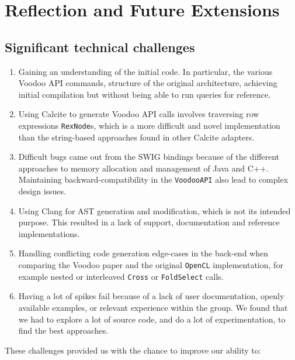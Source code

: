 \chapter{Reflection and Future Extensions}

\section{Significant technical challenges}

\begin{enumerate}
    \item Gaining an understanding of the initial code. In particular, the various Voodoo API commands, structure of the original architecture, achieving initial compilation but without being able to run queries for reference.
    \item Using Calcite to generate Voodoo API calls involves traversing row expressions \texttt{RexNode}s, which is a more difficult and novel implementation than the string-based approaches found in other Calcite adapters.
    \item Difficult bugs came out from the SWIG bindings because of the different approaches to memory allocation and management of Java and C++. Maintaining backward-compatibility in the \texttt{VoodooAPI} also lead to complex design issues.
    \item Using Clang for AST generation and modification, which is not its intended purpose. This resulted in a lack of support, documentation and reference implementations.
    \item Handling conflicting code generation edge-cases in the back-end when comparing the Voodoo paper \cite{Pirk:2016:VVA:3007328.3007336} and the original \texttt{OpenCL} implementation, for example nested or interleaved \texttt{Cross} or \texttt{FoldSelect} calls.
    \item Having a lot of spikes fail because of a lack of user documentation, openly available examples, or relevant experience within the group. We found that we had to explore a lot of source code, and do a lot of experimentation, to find the best approaches.
\end{enumerate}

These challenges provided us with the chance to improve our ability to:

